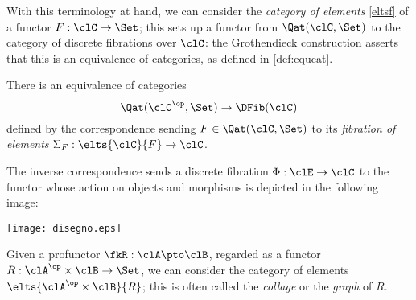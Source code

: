 \documentclass[a4paper]{../birkjour}
\begin{document}
With this terminology at hand, we can consider the \emph{category of elements} \ref{eltsf} of a functor $F : \clC\to \Set$; this sets up a functor from $\Qat(\clC,\Set)$ to the category of discrete fibrations over $\clC$: the Grothendieck construction asserts that this is an equivalence of categories, as defined in \ref{def:equcat}.
\begin{theorem}\label{thm:equconfib}
	There is an equivalence of categories
	\[
		\Qat(\clC^\op,\Set) \to \DFib(\clC)
	\]
	defined by the correspondence sending $F\in\Qat(\clC,\Set)$ to its \emph{fibration of elements}  $\Sigma_F : \elts{\clC}{F} \to \clC$.
\end{theorem}
The inverse correspondence sends a discrete fibration $\Phi : \clE \to \clC$ to the functor whose action on objects and morphisms is depicted in the following image:
\begin{center}
  \texttt{[image: disegno.eps]}
\end{center}
\begin{corollary}
  Given a profunctor $\fkR : \clA \pto \clB$, regarded as a functor $R : \clA^\op\times \clB \to \Set$, we can consider the category of elements $\elts{\clA^\op\times\clB}{R}$; this is often called the \emph{collage} or the \emph{graph} of $R$.
\end{corollary}
\end{document}
